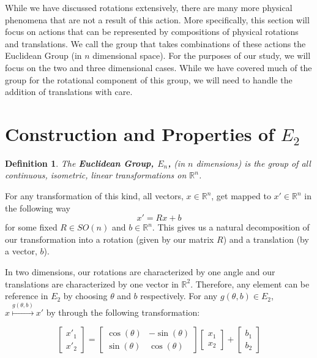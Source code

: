 \documentclass[10pt]{ucthesis}
\newcommand{\R}{\mathbb{R}}
\newtheorem{definition}{Definition}[chapter]
\begin{document}
While we have discussed rotations extensively, there are many more physical phenomena that are not a result of this action. More specifically, this section will focus on actions that can be represented by compositions of physical rotations and translations. We call the group that takes combinations of these actions the Euclidean Group (in $n$ dimensional space). For the purposes of our study, we will focus on the two and three dimensional cases. While we have covered much of the group for the rotational component of this group, we will need to handle the addition of translations with care.

\section{Construction and Properties of $E_2$}

\begin{definition}
	The \textbf{Euclidean Group, $E_n$,} (in $n$ dimensions) is the group of all continuous, isometric, linear transformations on $\R^n$.
\end{definition}

For any transformation of this kind, all vectors, $x\in\R^n$, get mapped to $x'\in\R^n$ in the following way 
$$x' = Rx + b$$
for some fixed $R\in SO(n)$ and $b\in\R^n$. This gives us a natural decomposition of our transformation into a rotation (given by our matrix $R$) and a translation (by a vector, $b$).

In two dimensions, our rotations are characterized by one angle and our translations are characterized by one vector in $\R^2$. Therefore, any element can be reference in $E_2$ by choosing $\theta$ and $b$ respectively. For any $g(\theta,b)\in E_2$, $x\overset{g(\theta,b)}{\mapsto}x'$ by through the following transformation:

$$\begin{bmatrix}x'_1\\x'_2\end{bmatrix} = \begin{bmatrix}
			\cos(\theta) & -\sin(\theta) \\
			\sin(\theta) & \cos(\theta) 
		\end{bmatrix} \begin{bmatrix}x_1\\x_2\end{bmatrix} + \begin{bmatrix}b_1\\b_2\end{bmatrix} $$
\end{document}
